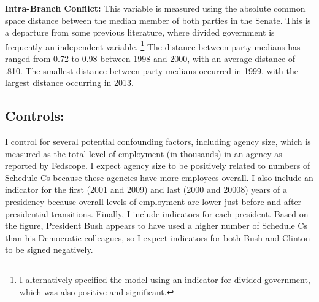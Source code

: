 \documentclass[12pt]{article}
\begin{document}
\noindent \textbf{Intra-Branch Conflict:} This variable is measured using the absolute common space distance between the median member of both parties in the Senate. This is a departure from some previous literature, where divided government is frequently an independent variable. \footnote{I alternatively specified the model using an indicator for divided government, which was also positive and significant.} The distance between party medians has ranged from 0.72 to 0.98 between 1998 and 2000, with an average distance of .810. The smallest distance between party medians occurred in 1999, with the largest distance occurring in 2013. 

\subsection*{Controls:}
I control for several potential confounding factors, including agency size, which is measured as the total level of employment (in thousands) in an agency as reported by Fedscope. I expect agency size to be positively related to numbers of Schedule Cs because these agencies have more employees overall. I also include an indicator for the first (2001 and 2009) and last (2000 and 20008) years of a presidency because overall levels of employment are lower just before and after presidential transitions. Finally, I include indicators for each president. Based on the figure, President Bush appears to have used a higher number of Schedule Cs than his Democratic colleagues, so I expect indicators for both Bush and Clinton to be signed negatively. 
\end{document}
